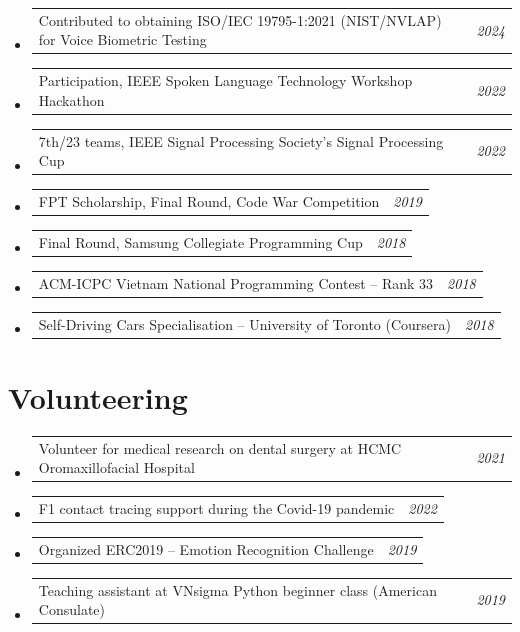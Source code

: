 \documentclass[10pt,a4paper]{article}
\makeatletter
\newcommand{\cvline}[2]{%
  \noindent
  \begin{tabular*}{\linewidth}{@{}l@{\extracolsep{\fill}}r@{}}
    #1 & \textit{\small #2}
  \end{tabular*}%
}
\makeatother
\begin{document}
\begin{itemize}
  \item \cvline{Contributed to obtaining ISO/IEC 19795-1:2021 (NIST/NVLAP) for Voice Biometric Testing}{2024}
  \item \cvline{Participation, IEEE Spoken Language Technology Workshop Hackathon}{2022}
  \item \cvline{7th/23 teams, IEEE Signal Processing Society's Signal Processing Cup}{2022}
  \item \cvline{FPT Scholarship, Final Round, Code War Competition}{2019}
  \item \cvline{Final Round, Samsung Collegiate Programming Cup}{2018}
  \item \cvline{ACM-ICPC Vietnam National Programming Contest -- Rank 33}{2018}
  \item \cvline{Self-Driving Cars Specialisation -- University of Toronto (Coursera)}{2018}
\end{itemize}

\section{Volunteering}

\begin{itemize}
  \item \cvline{Volunteer for medical research on dental surgery at HCMC Oromaxillofacial Hospital}{2021}
  \item \cvline{F1 contact tracing support during the Covid-19 pandemic}{2022}
  \item \cvline{Organized ERC2019 -- Emotion Recognition Challenge}{2019}
  \item \cvline{Teaching assistant at VNsigma Python beginner class (American Consulate)}{2019}
\end{itemize}
\end{document}
